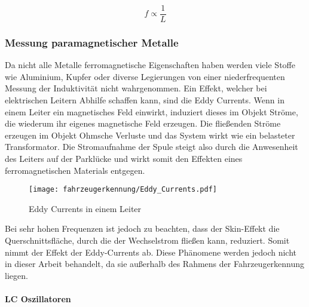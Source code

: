 \begin{equation} \label{iq:f_NE555}
    f \propto \frac{1}{L}
\end{equation} 

\pagebreak
\subsubsection{Messung paramagnetischer Metalle}
Da nicht alle Metalle ferromagnetische Eigenschaften haben werden viele Stoffe wie Aluminium, Kupfer oder diverse Legierungen
von einer niederfrequenten Messung der Induktivität nicht wahrgenommen. Ein Effekt, welcher bei elektrischen Leitern Abhilfe schaffen kann, sind 
die Eddy Currents. Wenn in einem Leiter ein magnetisches Feld einwirkt, induziert dieses im Objekt Ströme, die wiederum ihr eigenes magnetische Feld erzeugen.
Die fließenden Ströme erzeugen im Objekt Ohmsche Verluste und das System wirkt wie ein belasteter Transformator. Die Stromaufnahme der Spule steigt also durch die Anwesenheit
des Leiters auf der Parklücke und wirkt somit den Effekten eines ferromagnetischen Materials entgegen.

\begin{comment}
    welche normalerweise unerwünscht sind. Sie wirken auch einer Änderung des magnetischen Feldes entgegen,
da sie selbst Energie brauchen um ihre Richtung zu ändern. Je größer die Frequenz der eingespeisten Felddichte $B$ desto stärker wirkt die 
Flussdichte $B_{eddy}$ senkend auf die Gesamtflussdichte und so auf den magnetischen Fluss $\Phi$. 
Nach der Gleichung \ref{eq:L_phi} reduziert sich die Induktivität mit zunehmender Frequenz.
\end{comment}




\begin{figure}[H]
    \centering
    \texttt{[image: fahrzeugerkennung/Eddy\_Currents.pdf]}
    \caption{Eddy Currents in einem Leiter}
\end{figure}

Bei sehr hohen Frequenzen ist jedoch zu beachten, dass der Skin-Effekt die Querschnittsfläche, durch die der Wechselstrom fließen kann,
reduziert. Somit nimmt der Effekt der Eddy-Currents ab. Diese Phänomene werden jedoch nicht in dieser Arbeit behandelt, da sie außerhalb des Rahmens der 
Fahrzeugerkennung liegen. 

\paragraph{LC Oszillatoren}\mbox{}


